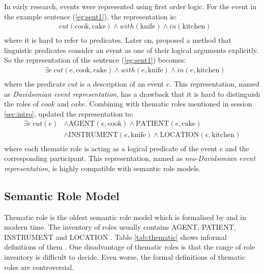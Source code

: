 \documentclass[a4paper]{article}
\begin{document}
In early research, events were represented using first order logic. For the event in the example sentence (\ref{eg:sent1}), the representation is:
\begin{equation*} \label{eg:fol}
\begin{aligned}
    & cut(\text{cook}, \text{cake}) \land with(\text{knife}) \land in(\text{kitchen}) \\
\end{aligned}
\end{equation*}
where it is hard to refer to predicates. Later on, \citet{davidson1967logical} proposed a method that linguistic predicates consider an event as one of their logical arguments explicitly. So the representation of the sentence (\ref{eg:sent1}) becomes: 
\begin{equation*} \label{eg:davidsonian}
\begin{aligned}
    & \exists e\ cut(e, \text{cook}, \text{cake}) \land with(e, \text{knife}) \land in(e, \text{kitchen}) \\
\end{aligned}
\end{equation*}
where the predicate $cut$ is a description of an event $e$. This representation, named as \textit{Davidsonian event representation}, has a drawback that it is hard to distinguish the roles of $cook$ and $cake$. Combining with thematic roles mentioned in session \ref{sec:intro}, \citet{parsons1990events} updated the representation to: 
\begin{equation} \label{eg:neodavidsonian}
\begin{aligned}
    \exists e\ cut(e)
    & \land \text{AGENT}(e, \text{cook}) \land \text{PATIENT}(e, \text{cake}) \\
    & \land \text{INSTRUMENT}(e, \text{knife}) \land \text{LOCATION}(e, \text{kitchen}) \\
\end{aligned}
\end{equation}
where each thematic role is acting as a logical predicate of the event $e$ and the corresponding participant. This representation, named as \textit{neo-Davidsonian event representation}, is highly compatible with semantic role models. 


\subsection{Semantic Role Model} \label{sec:semanticrole}
Thematic role is the oldest semantic role model which is formalised by \citet{gruber1965studies} and \citet{fillmore1968case} in modern time. The inventory of roles usually contains AGENT, PATIENT, INSTRUMENT and LOCATION \citep{aarts2013english}. Table \ref{tab:thematic} shows informal definitions of them \citep{jurafsky2014speech}. One disadvantage of thematic roles is that the range of role inventory is difficult to decide. Even worse, the formal definitions of thematic roles are controversial. 
\end{document}
